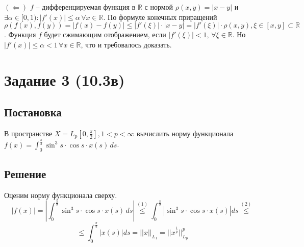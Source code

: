 \documentclass[14pt, a4paper, titlepage, fleqn]{extarticle}
\begin{document}
        \( (\Leftarrow) \) \( f \) -- дифференцируемая функция в \( \mathbb{R} \) с нормой \( \rho(x, y) = |x - y| \) и \( \exists  \alpha \in [0, 1): |f'(x)| \leq \alpha \, \forall x \in \mathbb{R}\). По формуле конечных приращений \( \rho\left(f(x), f(y)\right) = |f(x) - f(y)| \leq |f'(\xi)| \cdot |x - y| = |f'(\xi)| \cdot \rho(x, y), \xi \in [x, y]\subset \mathbb{R} \). Функция \( f \) будет сжимающим отображением, если \( |f'(\xi)| < 1, \, \forall \xi \in \mathbb{R} \). Но \( |f'(x)| \leq \alpha < 1  \, \forall x \in \mathbb{R} \), что и требовалось доказать.
    

    \pagebreak

    \section{Задание 3 (10.3в)}

        \subsection{Постановка}
        В пространстве \( X = L_p\left[ 0, \frac{\pi}{2} \right], 1 < p < \infty \) вычислить норму функционала \( f(x)  = \int_0^\frac{\pi}{2} \sin^3 s \cdot \cos s \cdot x(s) \, ds \).
        
        \subsection{Решение}
        Оценим норму функционала сверху.
        \[
            |f(x)| = \left| \int_0^\frac{\pi}{2} \sin^3 s \cdot \cos s \cdot x(s) \, ds \right| \stackrel{(1)}{\leq} 
            \int_0^\frac{\pi}{2} \left| \sin^3 s \cdot \cos s \cdot x(s) \right| ds \stackrel{(2)}{\leq} 
        \]
        \[
            \leq \int_0^\frac{\pi}{2} |x(s)| ds = ||x||_{L_1} = ||x^\frac{1}{p}||^p_{L_p}
        \]

\end{document}
